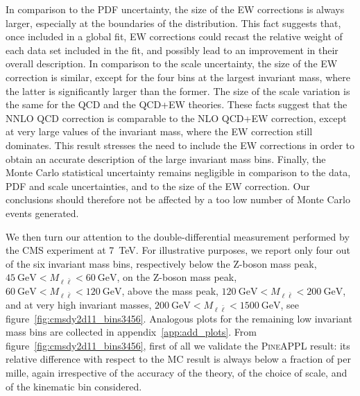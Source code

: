 In comparison to the PDF uncertainty, the size of the EW corrections is
always larger, especially at the boundaries of the distribution. This fact
suggests that, once included in a global fit, EW corrections could recast the
relative weight of each data set included in the fit, and possibly lead to
an improvement in their overall description. In comparison to the scale
uncertainty, the size of the EW correction is similar, except for the four bins
at the largest invariant mass, where the latter is significantly larger than
the former. The size of the scale variation is the same for the QCD and the
QCD+EW theories. These facts suggest that the NNLO QCD correction is comparable
to the NLO QCD+EW correction, except at very large values of the invariant mass,
where the EW correction still dominates. This result stresses the need to
include the EW corrections in order to obtain an accurate description of the
large invariant mass bins. Finally, the Monte Carlo statistical
uncertainty remains negligible in comparison to the data, PDF and scale
uncertainties, and to the size of the EW correction. Our conclusions should
therefore not be affected by a too low number of Monte Carlo events generated.

We then turn our attention to the double-differential measurement performed by
the CMS experiment at \SI{7}{\tera\electronvolt}. For illustrative purposes, we report only four out
of the six invariant mass bins, respectively below the Z-boson mass peak,
$\SI{45}{\giga\electronvolt}<M_{\ell\bar\ell}<\SI{60}{\giga\electronvolt}$, on the Z-boson mass peak,
$\SI{60}{\giga\electronvolt}<M_{\ell\bar\ell}<\SI{120}{\giga\electronvolt}$, above the mass peak,
$\SI{120}{\giga\electronvolt}<M_{\ell\bar\ell}<\SI{200}{\giga\electronvolt}$, and at very high invariant masses,
$\SI{200}{\giga\electronvolt}<M_{\ell\bar\ell}<\SI{1500}{\giga\electronvolt}$, see figure~\ref{fig:cmsdy2d11_bins3456}.
Analogous plots for the remaining low invariant mass bins are collected in
appendix~\ref{app:add_plots}. From figure~\ref{fig:cmsdy2d11_bins3456},
first of all we validate the \textsc{PineAPPL} result: its relative difference
with respect to the MC result is always below a fraction of per mille,
again irrespective of the accuracy of the theory, of the choice of scale, and
of the kinematic bin considered. 

